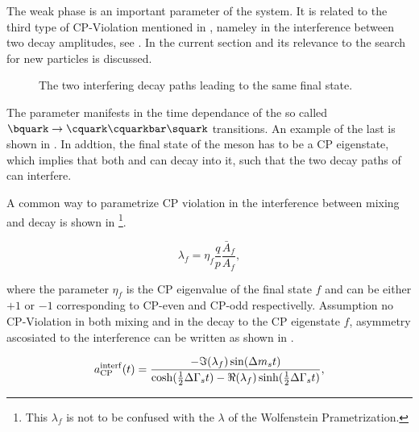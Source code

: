 The weak phase \phis is an important parameter of the \BBbarSyst system. It is related to the third
type of CP-Violation mentioned in , nameley in the interference between
two decay amplitudes, see . In the current section \phis and its relevance to
the search for new particles is discussed.

\newcommand{\ffig}{f}
\newcommand{\phimixfig}{\phi_\text{mix}}
\newcommand{\phifig}{\phi_\text{dec}}
\newcommand{\phibarfig}{\kern 0.15em \overline{\kern -0.15em \phi_\text{dec} \kern -0.60em} \kern 0.60em}
\begin{figure}[h]
  \centering
  \resizebox{0.4\textwidth}{!}{}
  \caption{The two interfering decay paths leading to the same final state.}
  \label{interference}
\end{figure}

The parameter \phis manifests in the time dependance of the so called $\bquark \rightarrow \cquark\cquarkbar\squark $ transitions.
An example of the last is shown in . In addtion, the final state of the \Bs meson has to be
a CP eigenstate, which implies that both \Bs and \Bsb can decay into it, such that the two decay paths
of  can interfere.

A common way to parametrize CP violation in the interference between mixing and decay is shown in 
\footnote{This $\lambda_f$ is not to be confused with the $\lambda$ of the Wolfenstein Prametrization.}.

\begin{equation}
 \lambda_{f} = \eta_f \frac{q}{p} \frac{\bar{A}_f}{A_f}, %
\label{lambda_cpv}
\end{equation}

\noindent where the parameter $\eta_f$ is the CP eigenvalue of the final state $f$ and can be either $+1$ or $-1$
corresponding to CP-even and CP-odd respectivelly. Assumption no CP-Violation in both \BBbarSyst mixing and in the
decay to the CP eigenstate $f$, asymmetry ascosiated to the interference can be written as shown in .

\newcommand{\half}{\frac{1}{2}}
\begin{equation}
  a_{\rm CP}^{\rm interf}(t) = \frac{ - \Im(\lambda_f) \sin(\Delta m_s t)} {\cosh(\half \Delta\Gamma_s t) - \Re(\lambda_f)\sinh(\half\Delta\Gamma_s t)},
\label{cpv_interf}
\end{equation}

